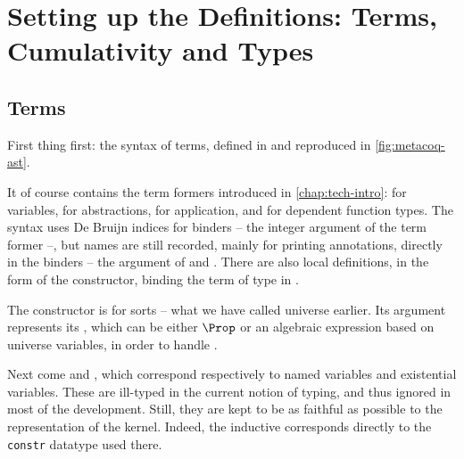 \section[Terms, Cumulativity and Types]{Setting up the Definitions: Terms, Cumulativity and Types}
\label{sec:meta-defs}

\subsection{Terms}

First thing first: the syntax of terms, defined in  and reproduced in \cref{fig:metacoq-ast}.

\begin{figure*}
  \caption{The Abstract Syntax Tree of terms in  ()}
  \label{fig:metacoq-ast}
\end{figure*}

It of course contains  the term formers introduced in \cref{chap:tech-intro}:
 for variables,  for abstractions,
 for application, and  for dependent function types.
The syntax uses De Bruijn indices for binders – the integer argument of the 
term former –, but names are still recorded, mainly for printing annotations, directly in the
binders – the  argument of  and .
There are also local definitions, in the form of the  constructor,
binding the term  of type  in .

The  constructor is for sorts – what we have called universe earlier.
Its  argument represents its , which can be either $\Prop$
or an algebraic expression based on universe variables, in order to handle .

Next come  and , which
correspond respectively to named variables and existential variables.
These are ill-typed in the current notion of typing,
and thus ignored in most of the development. Still, they are kept to be as
faithful as possible to the representation of the  kernel.
Indeed, the inductive  corresponds directly to the
\texttt{constr} datatype used there.%

